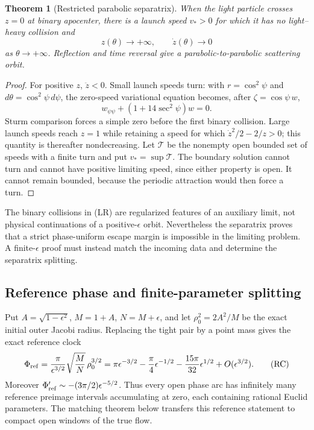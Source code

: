 \documentclass[11pt]{article}
\newtheorem{theorem}{Theorem}
\begin{document}
\begin{theorem}[Restricted parabolic separatrix]
When the light particle crosses $z=0$ at binary apocenter, there is a launch
speed $v_*>0$ for which it has no light--heavy collision and
\[
z(\theta)\to+\infty,\qquad \dot z(\theta)\to0
\]
as $\theta\to+\infty$. Reflection and time reversal give a
parabolic-to-parabolic scattering orbit.
\end{theorem}
\begin{proof}
For positive $z$, $\ddot z<0$. Small launch speeds turn: with
$r=\cos^2\psi$ and $d\theta=\cos^2\psi\,d\psi$, the zero-speed variational
equation becomes, after $\zeta=\cos\psi\,w$,
\[
w_{\psi\psi}+(1+14\sec^2\psi)w=0.
\]
Sturm comparison forces a simple zero before the first binary collision.
Large launch speeds reach $z=1$ while retaining a speed for which
$\dot z^2/2-2/z>0$; this quantity is thereafter nondecreasing.
Let $\mathcal T$ be the nonempty open bounded set of speeds with a finite
turn and put $v_*=\sup\mathcal T$. The boundary solution cannot turn and
cannot have positive limiting speed, since either property is open. It cannot
remain bounded, because the periodic attraction would then force a turn.
\end{proof}

The binary collisions in (LR) are regularized features of an auxiliary limit,
not physical continuations of a positive-$\epsilon$ orbit. Nevertheless the
separatrix proves that a strict phase-uniform escape margin is impossible in
the limiting problem. A finite-$\epsilon$ proof must instead match the
incoming data and determine the separatrix splitting.

\subsection{Reference phase and finite-parameter splitting}

Put $A=\sqrt{1-\epsilon^2}$, $M=1+A$, $N=M+\epsilon$, and let
$\rho_0^2=2A^2/M$ be the exact initial outer Jacobi radius. Replacing the tight
pair by a point mass gives the exact reference clock
\[
\Phi_{\rm ref}
=\frac{\pi}{\epsilon^{3/2}}\sqrt{\frac MN}\,\rho_0^{3/2}
=\pi\epsilon^{-3/2}-\frac\pi4\epsilon^{-1/2}
-\frac{15\pi}{32}\epsilon^{1/2}+O(\epsilon^{3/2}).
\tag{RC}
\]
Moreover
$\Phi_{\rm ref}'\sim-(3\pi/2)\epsilon^{-5/2}$. Thus every open phase arc
has infinitely many reference preimage intervals accumulating at zero, each
containing rational Euclid parameters. The matching theorem below transfers
this reference statement to compact open windows of the true flow.
\end{document}
